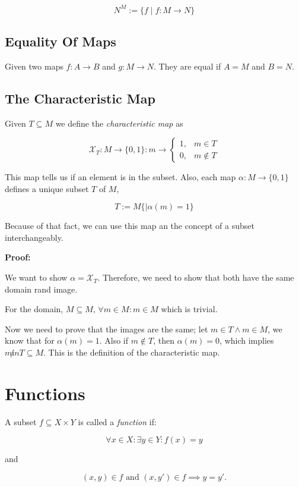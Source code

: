 \[
	N^M := \{f \mid f: M \to N\}
\]

\subsection{Equality Of Maps}

Given two maps  \(f: A \to B\) and \(g: M \to N\). They are equal if \(A = M\) and \(B = N\).

\subsection{The Characteristic Map}

Given \(T \subseteq M\) we define the \emph{characteristic map} as 

\[
	\mathcal{X}_T: M \to \{0,1\} : m \to \begin{cases} 
		1, &m \in T \\ 
		0, &m \notin T
	\end{cases}
\]

This map tells us if an element is in the subset. Also, each map \(\alpha : M \to \{0, 1\}\) defines a 
unique subset \(T\) of \(M\), 

\[
	T := M \{\mid \alpha(m) = 1 \}
\] 

Because of that fact, we can use this map an the concept of a subset interchangeably.

\textbf{Proof:}

We want to show \(\alpha = \mathcal{X}_T\). Therefore, we need to show that both have the same domain rand image. 

For the domain, \(M \subseteq M\), \(\forall m \in M: m \in M\) which is trivial.

Now we need to prove that the images are the same; let \(m \in T \land m \in M\), we know that for \(\alpha(m) = 1\). 
Also if \(m \notin T\), then \(\alpha(m) = 0\), which implies \(m \not in T \subseteq M\). This is the definition of the characteristic map.

\QED

\section{Functions} 

A subset \( f \subseteq X \times Y \) is called a \emph{function} if:

\[
	\forall x \in X: \exists y \in Y: f(x) = y
\]

and 

\[
	(x, y) \in f \text{ and } (x, y') \in f \implies y = y'.
\]

